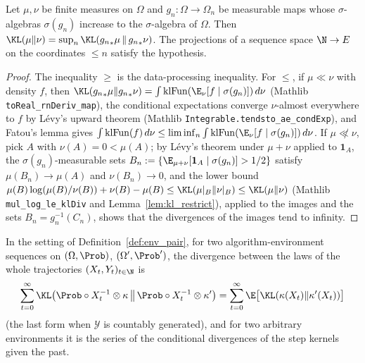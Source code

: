 \begin{lemma}\label{lem:kl_iSup_map}
\leanok
{}
Let $\mu,\nu$ be finite measures on $\Omega$ and $g_n : \Omega\to\Omega_n$ be measurable maps whose
$\sigma$-algebras $\sigma(g_n)$ increase to the $\sigma$-algebra of $\Omega$. Then
$\KL(\mu\|\nu) = \sup_n \KL({g_n}_*\mu\,\|\,{g_n}_*\nu)$. The projections of a sequence space
$\N\to E$ on the coordinates $\le n$ satisfy the hypothesis.
\end{lemma}

\begin{proof}
\leanok
{}
The inequality $\ge$ is the data-processing inequality. For $\le$, if $\mu\ll\nu$ with density
$f$, then $\KL({g_n}_*\mu\|{g_n}_*\nu) = \int\mathrm{klFun}(\E_\nu[f\mid\sigma(g_n)])\,d\nu$ (Mathlib
\texttt{toReal\_rnDeriv\_map}), the conditional expectations converge $\nu$-almost everywhere to
$f$ by L\'evy's upward theorem (Mathlib \texttt{Integrable.tendsto\_ae\_condExp}), and Fatou's
lemma gives $\int\mathrm{klFun}(f)\,d\nu \le \liminf_n\int\mathrm{klFun}(\E_\nu[f\mid\sigma(g_n)])\,d\nu$.
If $\mu\not\ll\nu$, pick $A$ with $\nu(A) = 0 < \mu(A)$; by L\'evy's theorem under $\mu+\nu$
applied to $\mathbf 1_A$, the $\sigma(g_n)$-measurable sets $B_n := \{\E_{\mu+\nu}[\mathbf 1_A\mid\sigma(g_n)] > 1/2\}$
satisfy $\mu(B_n)\to\mu(A)$ and $\nu(B_n)\to 0$, and the lower bound
$\mu(B)\log(\mu(B)/\nu(B)) + \nu(B) - \mu(B) \le \KL(\mu|_B\|\nu|_B) \le \KL(\mu\|\nu)$ (Mathlib
\texttt{mul\_log\_le\_klDiv} and Lemma~\ref{lem:kl_restrict}), applied to the images and the
sets $B_n = g_n^{-1}(C_n)$, shows that the divergences of the images tend to infinity.
\end{proof}

\begin{theorem}\label{thm:divergence_decomposition_trajectory}
\leanok
{}
In the setting of Definition~\ref{def:env_pair}, for two algorithm-environment sequences on
$(\Omega,\Prob)$, $(\Omega',\Prob')$, the divergence between the laws of the whole trajectories
$(X_t,Y_t)_{t\in\N}$ is
\[
  \sum_{t=0}^{\infty}\KL\big(\Prob\circ X_t^{-1}\otimes\kappa\,\big\|\,\Prob\circ X_t^{-1}\otimes\kappa'\big)
  = \sum_{t=0}^{\infty}\E\big[\KL(\kappa(X_t)\|\kappa'(X_t))\big]
\]
(the last form when $\mathcal{Y}$ is countably generated), and for two arbitrary environments it
is the series of the conditional divergences of the step kernels given the past.
\end{theorem}

